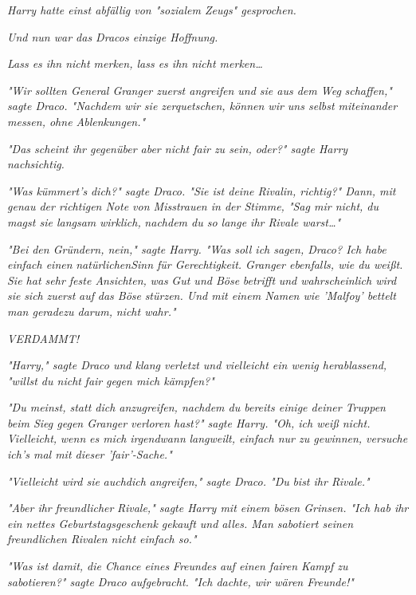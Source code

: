 {\emph{Harry hatte einst abfällig von "sozialem Zeugs" gesprochen.}

\emph{Und nun war das Dracos einzige Hoffnung.}

\emph{Lass es ihn nicht merken, lass es ihn nicht merken…}

\emph{"Wir sollten General Granger zuerst angreifen und sie aus dem Weg} \emph{schaffen," sagte Draco. "Nachdem wir sie zerquetschen, können wir uns selbst miteinander messen, ohne Ablenkungen."}

\emph{"Das scheint ihr gegenüber aber nicht fair zu sein, oder?" sagte Harry nachsichtig.}

\emph{"Was kümmert's} \emph{\emph{dich?}" sagte Draco. "Sie ist deine Rivalin, richtig?" Dann, mit genau der richtigen Note von Misstrauen in der Stimme, "Sag mir nicht, du magst sie langsam} \emph{\emph{wirklich,}} \emph{nachdem du so lange ihr Rivale warst…"}

\emph{"Bei den Gründern, nein," sagte Harry. "Was soll ich sagen, Draco? Ich habe einfach einen} \emph{natürlichenSinn für Gerechtigkeit. Granger ebenfalls, wie du weißt. Sie hat sehr feste Ansichten,} \emph{was} \emph{Gut und Böse} \emph{betrifft} \emph{und wahrscheinlich wird sie} \emph{sich} \emph{zuerst} \emph{auf} \emph{das Böse} \emph{stürzen. Und mit einem Namen wie 'Malfoy' bettelt man geradezu darum,} \emph{nicht wahr."}

\emph{\emph{VERDAMMT!}}

\emph{"Harry," sagte Draco und klang verletzt und vielleicht ein wenig herablassend, "willst du nicht} \emph{\emph{fair}} \emph{gegen mich kämpfen?"}

\emph{"Du meinst, statt dich anzugreifen, nachdem du bereits einige deiner Truppen beim Sieg gegen Granger verloren hast?" sagte Harry. "Oh, ich weiß nicht. Vielleicht,} \emph{wenn} \emph{es mich} \emph{irgendwann} \emph{langweilt, einfach nur zu gewinnen, versuche ich's mal mit dieser 'fair'-Sache."}

\emph{"Vielleicht wird sie} \emph{auch\emph{dich}} \emph{angreifen," sagte Draco. "\emph{Du}} \emph{bist ihr Rivale."}

\emph{"Aber ihr} \emph{\emph{freundlicher}} \emph{Rivale," sagte Harry mit einem bösen Grinsen. "Ich hab ihr ein nettes Geburtstagsgeschenk gekauft und alles. Man sabotiert seinen freundlichen Rivalen nicht einfach so."}

\emph{"Was ist damit, die Chance eines} \emph{\emph{Freundes}} \emph{auf einen fairen Kampf zu sabotieren?" sagte Draco aufgebracht. "Ich dachte, wir wären Freunde!"}

}
